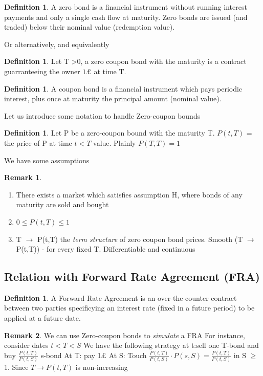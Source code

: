 \documentclass[10pt, oneside, reqno]{amsbook}
\theoremstyle{plain}%
\theoremstyle{definition}
\theoremstyle{rem}
\newtheorem*{rem}{Remark}
\theoremstyle{definition}
\newtheorem{dfn}[thm]{Definition}
\newcommand{\gt}{>}
\newcommand{\lt}{<}
\numberwithin{equation}{chapter}
\begin{document}
\begin{dfn}
 A zero bond is a financial instrument without running interest payments and only
a single cash flow at maturity. Zero bonds are issued (and traded) below their
nominal value (redemption value).
\end{dfn}
Or alternatively, and equivalently
\begin{dfn}
Let T \gt 0, a zero coupon bond with the maturity  is a contract guarranteeing the owner 
$1 \pounds$ at time T. 
\end{dfn}
\begin{dfn}A coupon bond is a financial instrument which pays periodic interest, plus
once at maturity the principal amount (nominal value).
\end{dfn}
Let us introduce some notation to handle Zero-coupon bounds 
\begin{dfn}
 Let P be a zero-coupon bound with the maturity T. 
$P(t,T)$ = the price of P at time $t \lt T$ value. Plainly $P(T,T) = 1$
\end{dfn}
We have some assumptions
\begin{rem} 
 \begin{enumerate}
  \item There exists a market which satisfies assumption H, where bonds of any maturity are sold and bought
\item $0 \leq P(t,T) \leq 1$
\item T $\to$ P(t,T) the \textit{term structure} of zero coupon bond prices. Smooth (T $\to$ P(t,T)) - for every
fixed T. Differentiable and continuous
 \end{enumerate}
\end{rem}
\subsection{Relation with Forward Rate Agreement (FRA)} 
\begin{dfn}
 A Forward Rate Agreement is an over-the-counter contract between two parties specificying an interest rate (fixed
in a future period) to be applied at a future date.
\end{dfn}
\begin{rem}
We can use Zero-coupon bonds to \textit{simulate} a FRA
For instance, consider dates $t \lt T \lt S$ 
We have the following strategy at t:sell one T-bond and buy $\frac{P(t,T)}{P(t,S)}$ s-bond
At T: pay 1$\pounds$ 
At S: Touch $\frac{P(t,T)}{P(t,S)}\cdot P(s,S)= \frac{P(t,T)}{P(t,S)}$ in S $\geq$ 1. 
Since $T \to P(t,T)$ is non-increasing
\end{rem}
\end{document}
